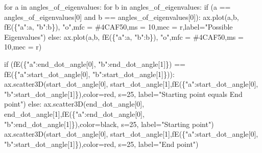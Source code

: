\documentclass[
  letterpaper,
  DIV=11,
  numbers=noendperiod]{scrartcl}
\newenvironment{Shaded}{\begin{snugshade}}{\end{snugshade}}
\newcommand{\ControlFlowTok}[1]{\textcolor[rgb]{0.00,0.23,0.31}{#1}}
\newcommand{\DecValTok}[1]{\textcolor[rgb]{0.68,0.00,0.00}{#1}}
\newcommand{\KeywordTok}[1]{\textcolor[rgb]{0.00,0.23,0.31}{#1}}
\newcommand{\NormalTok}[1]{\textcolor[rgb]{0.00,0.23,0.31}{#1}}
\newcommand{\OperatorTok}[1]{\textcolor[rgb]{0.37,0.37,0.37}{#1}}
\newcommand{\StringTok}[1]{\textcolor[rgb]{0.13,0.47,0.30}{#1}}
\begin{document}
\begin{Shaded}
\begin{Highlighting}[]
        \ControlFlowTok{for}\NormalTok{ a }\KeywordTok{in}\NormalTok{ angles\_of\_eigenvalues:}
            \ControlFlowTok{for}\NormalTok{ b }\KeywordTok{in}\NormalTok{ angles\_of\_eigenvalues:}
                \ControlFlowTok{if}\NormalTok{ (a }\OperatorTok{==}\NormalTok{ angles\_of\_eigenvalues[}\DecValTok{0}\NormalTok{] }\KeywordTok{and}\NormalTok{ b }\OperatorTok{==}\NormalTok{ angles\_of\_eigenvalues[}\DecValTok{0}\NormalTok{]):}
\NormalTok{                    ax.plot(a,b, fE(\{}\StringTok{"a"}\NormalTok{:a, }\StringTok{"b"}\NormalTok{:b\}), }\StringTok{"o"}\NormalTok{,mfc }\OperatorTok{=} \StringTok{\textquotesingle{}\#4CAF50\textquotesingle{}}\NormalTok{,ms }\OperatorTok{=} \DecValTok{10}\NormalTok{,mec }\OperatorTok{=} \StringTok{\textquotesingle{}r\textquotesingle{}}\NormalTok{,label}\OperatorTok{=}\StringTok{"Possible Eigenvalues"}\NormalTok{)}
                \ControlFlowTok{else}\NormalTok{:}
\NormalTok{                    ax.plot(a,b, fE(\{}\StringTok{"a"}\NormalTok{:a, }\StringTok{"b"}\NormalTok{:b\}), }\StringTok{"o"}\NormalTok{,mfc }\OperatorTok{=} \StringTok{\textquotesingle{}\#4CAF50\textquotesingle{}}\NormalTok{,ms }\OperatorTok{=} \DecValTok{10}\NormalTok{,mec }\OperatorTok{=} \StringTok{\textquotesingle{}r\textquotesingle{}}\NormalTok{)}

        \ControlFlowTok{if}\NormalTok{ (fE(\{}\StringTok{"a"}\NormalTok{:end\_dot\_angle[}\DecValTok{0}\NormalTok{], }\StringTok{"b"}\NormalTok{:end\_dot\_angle[}\DecValTok{1}\NormalTok{]\}) }\OperatorTok{==}\NormalTok{ fE(\{}\StringTok{"a"}\NormalTok{:start\_dot\_angle[}\DecValTok{0}\NormalTok{], }\StringTok{"b"}\NormalTok{:start\_dot\_angle[}\DecValTok{1}\NormalTok{]\})):}
\NormalTok{            ax.scatter3D(start\_dot\_angle[}\DecValTok{0}\NormalTok{], start\_dot\_angle[}\DecValTok{1}\NormalTok{],fE(\{}\StringTok{"a"}\NormalTok{:start\_dot\_angle[}\DecValTok{0}\NormalTok{], }\StringTok{"b"}\NormalTok{:start\_dot\_angle[}\DecValTok{1}\NormalTok{]\}),color}\OperatorTok{=}\StringTok{\textquotesingle{}red\textquotesingle{}}\NormalTok{, s}\OperatorTok{=}\DecValTok{25}\NormalTok{, label}\OperatorTok{=}\StringTok{"Starting point equals End point"}\NormalTok{)}
        \ControlFlowTok{else}\NormalTok{:}
\NormalTok{            ax.scatter3D(end\_dot\_angle[}\DecValTok{0}\NormalTok{], end\_dot\_angle[}\DecValTok{1}\NormalTok{],fE(\{}\StringTok{"a"}\NormalTok{:end\_dot\_angle[}\DecValTok{0}\NormalTok{], }\StringTok{"b"}\NormalTok{:end\_dot\_angle[}\DecValTok{1}\NormalTok{]\}),color}\OperatorTok{=}\StringTok{\textquotesingle{}black\textquotesingle{}}\NormalTok{, s}\OperatorTok{=}\DecValTok{25}\NormalTok{, label}\OperatorTok{=}\StringTok{"Starting point"}\NormalTok{)}
\NormalTok{            ax.scatter3D(start\_dot\_angle[}\DecValTok{0}\NormalTok{], start\_dot\_angle[}\DecValTok{1}\NormalTok{],fE(\{}\StringTok{"a"}\NormalTok{:start\_dot\_angle[}\DecValTok{0}\NormalTok{], }\StringTok{"b"}\NormalTok{:start\_dot\_angle[}\DecValTok{1}\NormalTok{]\}),color}\OperatorTok{=}\StringTok{\textquotesingle{}red\textquotesingle{}}\NormalTok{, s}\OperatorTok{=}\DecValTok{25}\NormalTok{, label}\OperatorTok{=}\StringTok{"End point"}\NormalTok{)}



\end{Highlighting}
\end{Shaded}
\end{document}

